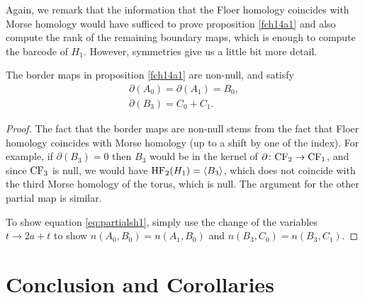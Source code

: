 Again, we remark that the information that the Floer homology coincides with Morse homology would have sufficed to prove proposition \ref{fch14a1} and also compute the rank of the remaining boundary maps, which is enough to compute the barcode of $H_1$. However, symmetries give us a little bit more detail.

\begin{prop}\label{fch14a2}
The border maps in proposition \ref{fch14a1} are non-null, and satisfy
\begin{equation}\label{eq:partialsh1}
\begin{gathered}
\partial(A_0) = \partial(A_1) = B_0,\\
\partial(B_3) = C_0 + C_1.
\end{gathered}
\end{equation}
\end{prop}

\begin{proof}
The fact that the border maps are non-null stems from the fact that Floer homology coincides with Morse homology (up to a shift by one of the index). For example, if $\partial(B_3) = 0$ then $B_3$ would be in the kernel of $\partial \colon \mathrm{CF}_2 \to \mathrm{CF}_1$, and since $\mathrm{CF}_3$ is null, we would have $\mathrm{HF}_2(H_1) = \langle B_3\rangle$, which does not coincide with the third Morse homology of the torus, which is null. The argument for the other partial map is similar.

To show equation \eqref{eq:partialsh1}, simply use the change of the variables $t \to 2a + t$ to show $n(A_0,B_0) = n(A_1,B_0)$ and $n(B_3,C_0) = n(B_3,C_1)$.
\end{proof}

\section{Conclusion and Corollaries}

